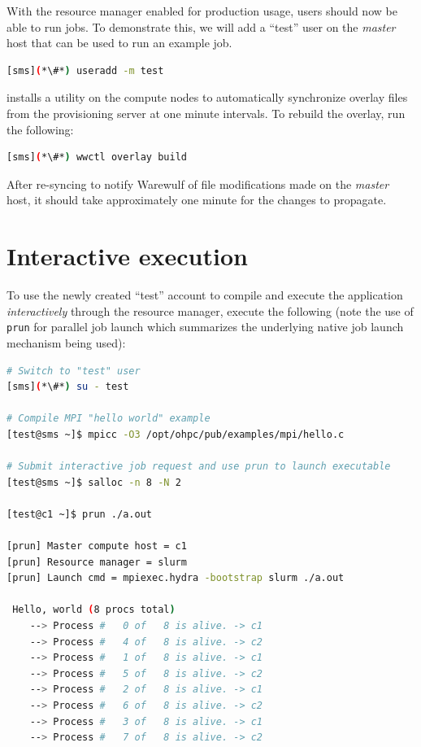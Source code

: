 With the resource manager enabled for production usage, users should now be
able to run jobs. To demonstrate this, we will add a ``test'' user on the {\em master}
host that can be used to run an example job.

\begin{lstlisting}[language=bash,keywords={}]
[sms](*\#*) useradd -m test
\end{lstlisting}

\Warewulf{} installs a utility on the compute nodes to automatically
synchronize overlay files from the provisioning server at one minute intervals.
To rebuild the overlay, run the following:

\begin{lstlisting}[language=bash,keywords={}]
[sms](*\#*) wwctl overlay build
\end{lstlisting}


After re-syncing to notify Warewulf of file modifications made on the {\em
master} host, it should take approximately one minute for the changes to
propagate.





\section{Interactive execution}
To use the newly created ``test'' account to compile and execute the
application {\em interactively} through the resource manager, execute the
following (note the use of \texttt{prun} for parallel job launch which summarizes
the underlying native job launch mechanism being used):

\begin{lstlisting}[language=bash,keywords={}]
# Switch to "test" user
[sms](*\#*) su - test

# Compile MPI "hello world" example
[test@sms ~]$ mpicc -O3 /opt/ohpc/pub/examples/mpi/hello.c

# Submit interactive job request and use prun to launch executable
[test@sms ~]$ salloc -n 8 -N 2

[test@c1 ~]$ prun ./a.out

[prun] Master compute host = c1
[prun] Resource manager = slurm
[prun] Launch cmd = mpiexec.hydra -bootstrap slurm ./a.out

 Hello, world (8 procs total)
    --> Process #   0 of   8 is alive. -> c1
    --> Process #   4 of   8 is alive. -> c2
    --> Process #   1 of   8 is alive. -> c1
    --> Process #   5 of   8 is alive. -> c2
    --> Process #   2 of   8 is alive. -> c1
    --> Process #   6 of   8 is alive. -> c2
    --> Process #   3 of   8 is alive. -> c1
    --> Process #   7 of   8 is alive. -> c2
\end{lstlisting}


